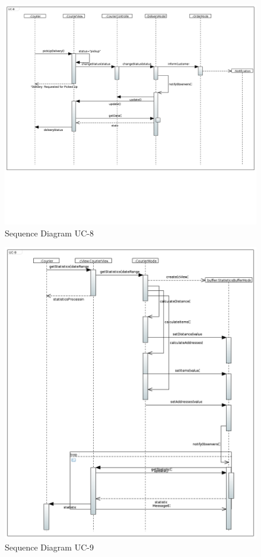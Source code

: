 \begin{figure}[h!]
\begin{center}
\includegraphics[scale=0.35]{FIGS/UC-81.PNG}
    \caption{Sequence Diagram UC-8}
    \label{fig:seq_diag8}
\end{center}
\end{figure}

\begin{figure}[h!]
\begin{center}
\includegraphics[scale=0.35]{FIGS/UC-91.PNG}
    \caption{Sequence Diagram UC-9}
    \label{fig:seq_diag9}
\end{center}
\end{figure}

